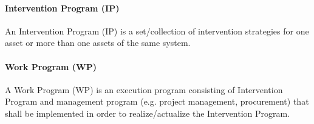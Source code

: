 \paragraph{\textbf{Intervention Program (IP)}}
An Intervention Program (IP) is a set/collection of intervention strategies for one asset or more than one assets of the same system.

\paragraph{\textbf{Work Program (WP)}}
A Work Program (WP) is an execution program consisting of Intervention Program and management program (e.g. project management, procurement) that shall be implemented in order to realize/actualize the Intervention Program.


